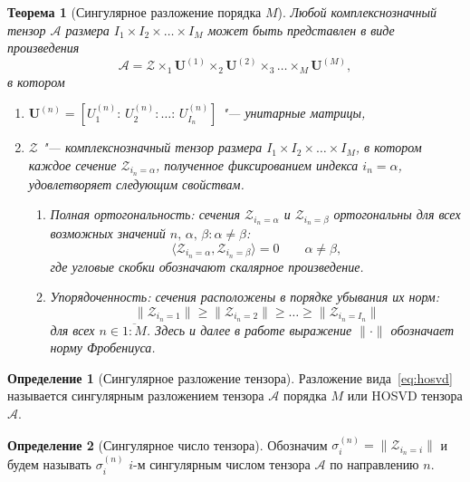 \documentclass[specialist,
  substylefile = spbu.rtx,
subf,href,colorlinks=true, 12pt]{disser}
\theoremstyle{plain}
\newtheorem{theorem}{Теорема}[section]
\theoremstyle{definition}
\newtheorem{definition}{Определение}[section]
\theoremstyle{remark}
\begin{document}
\begin{theorem}
  [Сингулярное разложение порядка $M$]
  Любой комплекснозначный тензор $\mathcal{A}$ размера $I_1\times I_2
  \times \ldots \times I_M$ может быть представлен
  в виде произведения
  \begin{equation}
    \mathcal{A} = \mathcal{Z} \times_1 \mathbf{U}^{(1)} \times_2
    \mathbf{U}^{(2)} \times_3 \ldots \times_M
    \mathbf{U}^{(M)},\label{eq:hosvd}
  \end{equation}
  в котором
  \begin{enumerate}
    \item $\mathbf{U}^{(n)}=\left[U_1^{(n)}:\, U_2^{(n)}:\ldots:\,
      U_{I_n}^{(n)} \right]$ "--- унитарные матрицы,
    \item $\mathcal{Z}$ "--- комплекснозначный тензор размера
      $I_1\times I_2 \times \ldots \times I_M$, в котором
      каждое сечение $\mathcal Z_{i_n=\alpha}$, полученное
      фиксированием индекса $i_n=\alpha$, удовлетворяет следующим свойствам.
      \begin{enumerate}
        \item Полная ортогональность: сечения $\mathcal
          Z_{i_n=\alpha}$ и $\mathcal Z_{i_n=\beta}$ ортогональны для
          всех возможных значений
          $n,\, \alpha,\, \beta: \alpha\ne\beta$:
          \[
            \langle\mathcal Z_{i_n=\alpha},\mathcal
            Z_{i_n=\beta}\rangle=0 \qquad \alpha\ne\beta,
          \]
          где угловые скобки обозначают скалярное произведение.
        \item Упорядоченность: сечения расположены в порядке убывания
          их норм:
          \begin{equation}
            \|\mathcal Z_{i_n=1}\|\geqslant\|\mathcal Z_{i_n=2}\|
            \geqslant \ldots \geqslant\|\mathcal Z_{i_n=I_n}\|\label{eq:order}
          \end{equation}
          для всех $n\in \overline{1:M}$. Здесь и далее в работе
          выражение $\|\cdot\|$ обозначает норму Фробениуса.
      \end{enumerate}
  \end{enumerate}
\end{theorem}
\begin{definition}[Сингулярное разложение тензора]
  \label{def:hosvd}
  Разложение вида~\eqref{eq:hosvd} называется сингулярным разложением
  тензора $\mathcal{A}$ порядка $M$ или
  HOSVD тензора $\mathcal{A}$.
\end{definition}
\begin{definition}[Сингулярное число тензора]
  \label{def:singular-value}
  Обозначим $\sigma_i^{(n)}=\|\mathcal Z_{i_n=i}\|$ и будем называть
  $\sigma_i^{(n)}$ $i$-м сингулярным числом
  тензора $\mathcal A$ по направлению $n$.
\end{definition}
\end{document}
